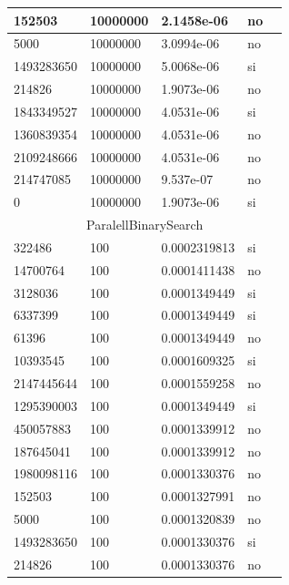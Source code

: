 \documentclass[12pt, fleqn]{article}                             %
\theoremstyle{break}                                            %
\begin{document}
\begin{longtable}{|m{5em}|m{5em}|m{10em}|m{5em}|@{}m{0pt}@{}}
            152503& 10000000  & 2.1458e-06 & no &\\[1em]    \hline
            5000& 10000000  & 3.0994e-06 & no &\\[1em]    \hline
            1493283650& 10000000  & 5.0068e-06 & si &\\[1em]    \hline
            214826& 10000000  & 1.9073e-06 & no &\\[1em]    \hline
            1843349527& 10000000  & 4.0531e-06 & si &\\[1em]    \hline
            1360839354& 10000000  & 4.0531e-06 & no &\\[1em]    \hline
            2109248666& 10000000  & 4.0531e-06 & no &\\[1em]    \hline
            214747085& 10000000  & 9.537e-07 & no &\\[1em]    \hline
            0& 10000000  & 1.9073e-06 & si &\\[1em]    \hline
            \multicolumn{5}{|c|}{ParalellBinarySearch}   \\          \hline
            322486& 100  & 0.0002319813 & si &\\[1em]    \hline
            14700764& 100  & 0.0001411438 & no &\\[1em]    \hline
            3128036& 100  & 0.0001349449 & si &\\[1em]    \hline
            6337399& 100  & 0.0001349449 & si &\\[1em]    \hline
            61396& 100  & 0.0001349449 & no &\\[1em]    \hline
            10393545& 100  & 0.0001609325 & si &\\[1em]    \hline
            2147445644& 100  & 0.0001559258 & no &\\[1em]    \hline
            1295390003& 100  & 0.0001349449 & si &\\[1em]    \hline
            450057883& 100  & 0.0001339912 & no &\\[1em]    \hline
            187645041& 100  & 0.0001339912 & no &\\[1em]    \hline
            1980098116& 100  & 0.0001330376 & no &\\[1em]    \hline
            152503& 100  & 0.0001327991 & no &\\[1em]    \hline
            5000& 100  & 0.0001320839 & no &\\[1em]    \hline
            1493283650& 100  & 0.0001330376 & si &\\[1em]    \hline
            214826& 100  & 0.0001330376 & no &\\[1em]    \hline

\end{longtable}
\end{document}
